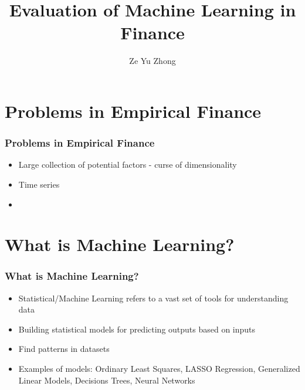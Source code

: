 \documentclass{beamer}
\title{Evaluation of Machine Learning in Finance}
\author{Ze Yu Zhong}
\begin{document}
	

\begin{frame}[plain]
    \maketitle
\end{frame}

\begin{frame}
	\tableofcontents
\end{frame}

\section{Problems in Empirical Finance}

\begin{frame}
\frametitle{Problems in Empirical Finance}
\begin{itemize}
	\item Large collection of potential factors - curse of dimensionality
	\item Time series
	\item 
\end{itemize}
\end{frame}

\section{What is Machine Learning?}

\begin{frame}
\frametitle{What is Machine Learning?}
\begin{itemize}
	\item Statistical/Machine Learning refers to a vast set of tools for understanding data
	\item Building statistical models for predicting outputs based on inputs
	\item Find patterns in datasets
	\item Examples of models: Ordinary Least Squares, LASSO Regression, Generalized Linear Models, Decisions Trees, Neural Networks
\end{itemize}
\end{frame}
\end{document}

